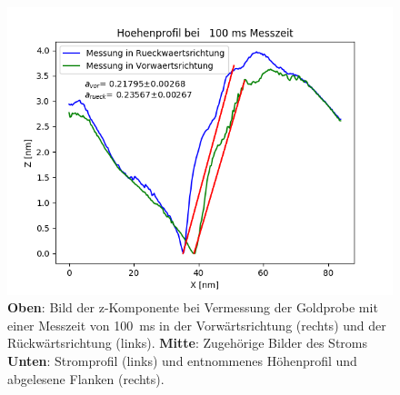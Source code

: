 \documentclass[12pt,a4paper]{article}
\begin{document}
\begin{figure}[H]
\includegraphics[scale=0.5]{Bilder/Anhang/Zeit/Profil_Zeit_100.png}
\caption{\textbf{Oben}: Bild der z-Komponente bei Vermessung der Goldprobe mit einer Messzeit von \SI{100}{ms} in der Vorwärtsrichtung (rechts) und der Rückwärtsrichtung (links). \textbf{Mitte}: Zugehörige Bilder des Stroms \textbf{Unten}: Stromprofil (links) und entnommenes Höhenprofil und abgelesene Flanken (rechts).}
\end{figure}
\end{document}
